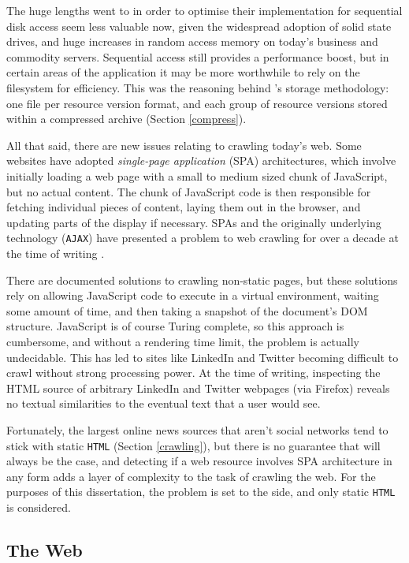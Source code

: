 The huge lengths  went to in order to optimise
their implementation for sequential disk
access seem less valuable now, given the widespread adoption of solid
state drives, and huge increases in random access memory on today's
business and commodity servers.  Sequential access still provides
a performance boost, but in certain areas of the application it may
be more worthwhile to rely on the filesystem for efficiency.  This was
the reasoning behind \nr{}'s storage methodology: one file per resource
version format, and each group of resource versions stored within a
compressed archive (Section \ref{compress}).

All that said, there are new issues relating to crawling today's web.
Some websites have adopted {\it single-page application} (SPA)
architectures, which involve initially loading a web page
with a small to medium sized chunk of JavaScript, but no
actual content.  The chunk of JavaScript code is then responsible
for fetching individual pieces of content, laying them out in
the browser, and updating parts of the display if necessary.
SPAs and the originally underlying technology ({\tt AJAX}) have
presented a problem to web crawling for over a decade at the time
of writing \cite{matter2008, mesbah2012}.

There are documented solutions to crawling non-static pages, but
these solutions rely on allowing JavaScript code to execute in
a virtual environment, waiting some amount of time, and
then taking a snapshot of the document's DOM structure.
JavaScript is of course Turing complete, so this approach is
cumbersome, and without a rendering time limit, the problem is
actually undecidable.  This has led to sites like LinkedIn and
Twitter becoming difficult to crawl without strong processing
power. At the time of writing, inspecting the HTML source of arbitrary
LinkedIn and Twitter webpages (via Firefox) reveals no textual
similarities to the eventual text that a user would see.

Fortunately, the largest online news sources that aren't social
networks tend to stick with static {\tt HTML} (Section \ref{crawling}),
but there is no
guarantee that will always be the case, and detecting if a web
resource involves SPA architecture in any form adds a layer of
complexity to the task of crawling the web.  For the purposes of
this dissertation, the problem is set to the side, and only static
{\tt HTML} is considered.

\subsection{The Web}

